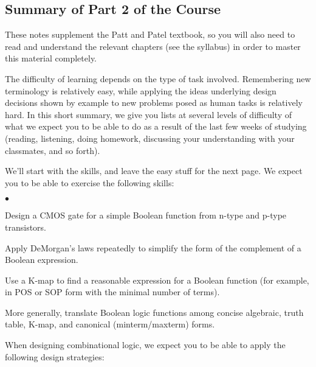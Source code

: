 \classtitle

\subsection{Summary of Part 2 of the Course}

These notes supplement the Patt and Patel textbook, so you will also 
need to read and understand the relevant chapters (see the syllabus)
in order to master this material completely.

The difficulty of learning depends on the type of task involved.
Remembering new terminology is relatively easy, while applying
the ideas underlying design decisions shown by example to new problems 
posed as human tasks is relatively hard.
%
In this short summary, we give you lists at several levels of difficulty 
of what we expect you to be able to do as a result of the last few weeks 
of studying (reading, listening, doing homework, discussing your 
understanding with your classmates, and so forth).

We'll start with the skills, and leave the easy stuff for the next page.
%
We expect you to be able to exercise the following skills:

\begin{list}{$\bullet$}{\setlength{\itemsep}{0pt}\setlength{\parskip}{0pt}%
\setlength{\topsep}{0pt}\setlength{\partopsep}{0pt}\setlength{\parsep}{0pt}}

\item{Design a CMOS gate for a simple Boolean function from n-type 
and p-type transistors.}

\item{Apply DeMorgan's laws repeatedly to simplify the form of
the complement of a Boolean expression.}

\item{Use a K-map to find a reasonable expression for a Boolean function (for
example, in POS or SOP form with the minimal number of terms).}

\item{More generally, translate Boolean logic functions among 
concise algebraic, truth table, K-map, and canonical (minterm/maxterm) forms.}

\end{list}

When designing combinational logic, we expect you to be able to apply
the following design strategies:


